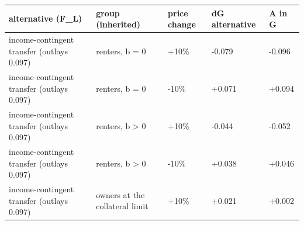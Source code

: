 \begingroup\small
\setlength{\tabcolsep}{3pt}
\renewcommand{\arraystretch}{1.04}
\begin{tabularx}{\linewidth}{XXXXX}
\toprule
alternative (F\_L) & group (inherited) & price change & dG alternative & A in G \\
\midrule
income-contingent transfer (outlays 0.097) & renters, b = 0 & +10\% & -0.079 & -0.096 \\
income-contingent transfer (outlays 0.097) & renters, b = 0 & -10\% & +0.071 & +0.094 \\
income-contingent transfer (outlays 0.097) & renters, b \textgreater{} 0 & +10\% & -0.044 & -0.052 \\
income-contingent transfer (outlays 0.097) & renters, b \textgreater{} 0 & -10\% & +0.038 & +0.046 \\
income-contingent transfer (outlays 0.097) & owners at the collateral limit & +10\% & +0.021 & +0.002 \\
\bottomrule
\end{tabularx}
\endgroup
